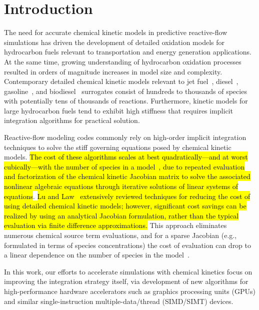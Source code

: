 \documentclass[preprint,review,11pt]{elsarticle}
\DeclareRobustCommand{\hly}[1]{\sethlcolor{yellow}\hl{#1}}
\begin{document}
\clearpage

\section{Introduction}
\label{sec:Intro}

The need for accurate chemical kinetic models in predictive reactive-flow simulations has driven the development of detailed oxidation models for hydrocarbon fuels relevant to transportation and energy generation applications.
At the same time, growing understanding of hydrocarbon oxidation processes resulted in orders of magnitude increases in model size and complexity.
Contemporary detailed chemical kinetic models relevant to jet fuel~\cite{Naik2011434}, diesel~\cite{Sarathy:2011kx}, gasoline~\cite{Mehl:2011jn}, and biodiesel~\cite{Herbinet:2010gu} surrogates consist of hundreds to thousands of species with potentially tens of thousands of reactions.
Furthermore, kinetic models for large hydrocarbon fuels tend to exhibit high stiffness that requires implicit integration algorithms for practical solution.

Reactive-flow modeling codes commonly rely on high-order implicit integration techniques to solve the stiff governing equations posed by chemical kinetic models.
\hly{The cost of these algorithms scales at best quadratically---and at worst cubically---with the number of species in a model~\cite{Lu:2009gh}, due to repeated evaluation and factorization of the chemical kinetic Jacobian matrix to solve the associated nonlinear algebraic equations through iterative solutions of linear systems of equations}.
\hly{Lu and Law~\cite{Lu:2009gh} extensively reviewed techniques for reducing the cost of using detailed chemical kinetic models; however, significant cost savings can be realized by using an analytical Jacobian formulation, rather than the typical evaluation via finite difference approximations.}
This approach eliminates numerous chemical source term evaluations, and for a sparse Jacobian (e.g., formulated in terms of species concentrations) the cost of evaluation can drop to a linear dependence on the number of species in the model~\cite{Lu:2009gh}.

In this work, our efforts to accelerate simulations with chemical kinetics focus on improving the integration strategy itself, via development of new algorithms for high-performance hardware accelerators such as graphics processing units (GPUs) and similar single-instruction multiple-data\slash thread (SIMD\slash SIMT) devices.
\end{document}
